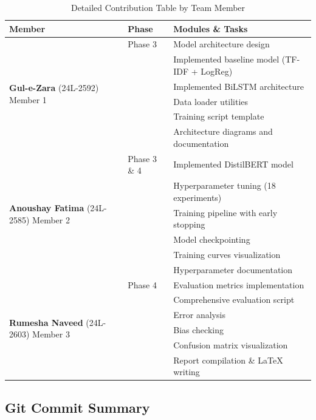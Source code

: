 \documentclass[12pt,a4paper]{article}
\begin{document}
\begin{table}[H]
\centering
\small
\begin{tabular}{@{}p{4cm}p{3.5cm}p{6.5cm}@{}}
\toprule
\textbf{Member} & \textbf{Phase} & \textbf{Modules \& Tasks} \\ \midrule
\multirow{6}{4cm}{\textbf{Gul-e-Zara} \newline (24L-2592) \newline Member 1} 
& Phase 3 & Model architecture design \\
& & Implemented baseline model (TF-IDF + LogReg) \\
& & Implemented BiLSTM architecture \\
& & Data loader utilities \\
& & Training script template \\
& & Architecture diagrams and documentation \\ \midrule

\multirow{6}{4cm}{\textbf{Anoushay Fatima} \newline (24L-2585) \newline Member 2} 
& Phase 3 \& 4 & Implemented DistilBERT model \\
& & Hyperparameter tuning (18 experiments) \\
& & Training pipeline with early stopping \\
& & Model checkpointing \\
& & Training curves visualization \\
& & Hyperparameter documentation \\ \midrule

\multirow{6}{4cm}{\textbf{Rumesha Naveed} \newline (24L-2603) \newline Member 3} 
& Phase 4 & Evaluation metrics implementation \\
& & Comprehensive evaluation script \\
& & Error analysis \\
& & Bias checking \\
& & Confusion matrix visualization \\
& & Report compilation \& LaTeX writing \\ \bottomrule
\end{tabular}
\caption{Detailed Contribution Table by Team Member}
\label{tab:contributions}
\end{table}

\subsection{Git Commit Summary}
\end{document}
